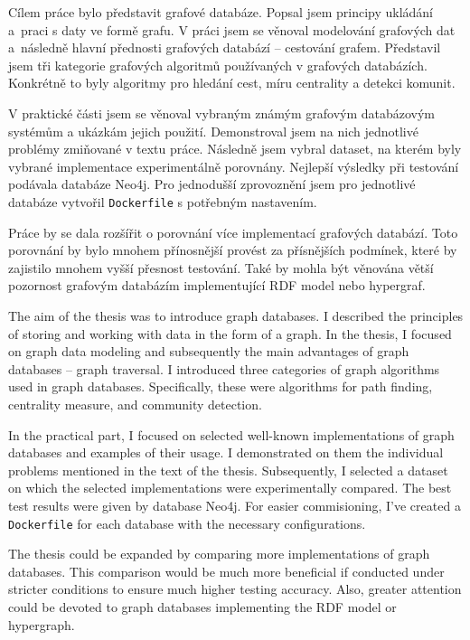 \documentclass[
  program=infoi,
  biblatex=true,
  figures=true,
  glossaries=false,
  index,
  sourcecodes=true
]{kidiplom}
\begin{document}
\begin{kiconclusions}
Cílem práce bylo představit grafové databáze. Popsal jsem principy ukládání a~praci s daty ve formě grafu. V práci jsem se věnoval modelování grafových dat a~následně hlavní přednosti grafových databází -- cestování grafem. Představil jsem tři kategorie grafových algoritmů používaných v grafových databázích. Konkrétně to byly algoritmy pro hledání cest, míru centrality a detekci komunit.

V praktické části jsem se věnoval vybraným známým grafovým databázovým systémům a ukázkám jejich použití. Demonstroval jsem na nich jednotlivé problémy zmiňované v textu práce. Následně jsem vybral dataset, na kterém byly vybrané implementace experimentálně porovnány. Nejlepší výsledky při testování podávala databáze Neo4j. Pro jednodušší zprovoznění jsem pro jednotlivé databáze vytvořil \texttt{Dockerfile} s potřebným nastavením.

Práce by se dala rozšířit o porovnání více implementací grafových databází. Toto porovnání by bylo mnohem přínosnější provést za přísnějších podmínek, které by zajistilo mnohem vyšší přesnost testování. Také by mohla být věnována větší pozornost grafovým databázím implementující RDF model nebo hypergraf.

\end{kiconclusions}

\begin{kiconclusions}[english]
The aim of the thesis was to introduce graph databases. I described the principles of storing and working with data in the form of a graph. In the thesis, I focused on graph data modeling and subsequently the main advantages of graph databases -- graph traversal. I introduced three categories of graph algorithms used in graph databases. Specifically, these were algorithms for path finding, centrality measure, and community detection.

In the practical part, I focused on selected well-known implementations of graph databases and examples of their usage. I demonstrated on them the individual problems mentioned in the text of the thesis. Subsequently, I selected a dataset on which the selected implementations were experimentally compared. The best test results were given by database Neo4j. For easier commisioning, I've created a \texttt{Dockerfile} for each database with the necessary configurations.

The thesis could be expanded by comparing more implementations of graph databases. This comparison would be much more beneficial if conducted under stricter conditions to ensure much higher testing accuracy. Also, greater attention could be devoted to graph databases implementing the RDF model or hypergraph.
\end{kiconclusions}
\end{document}
